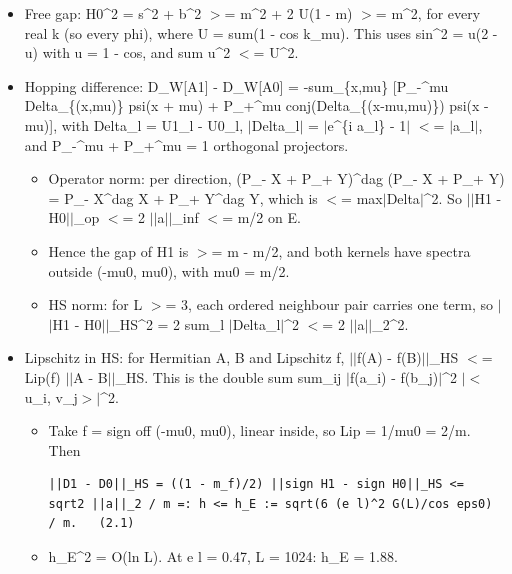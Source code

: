 \documentclass[11pt,a4paper]{article}
\begin{document}
\begin{itemize}
\item{} Free gap: H0\textasciicircum{}2 = s\textasciicircum{}2 + b\textasciicircum{}2 $>$= m\textasciicircum{}2 + 2 U(1 - m) $>$= m\textasciicircum{}2, for every real k (so every phi), where U = sum(1 - cos k\_mu).
This uses sin\textasciicircum{}2 = u(2 - u) with u = 1 - cos, and sum u\textasciicircum{}2 $<$= U\textasciicircum{}2.
\item{} Hopping difference: D\_W[A1] - D\_W[A0] = -sum\_\{x,mu\} [P\_-\textasciicircum{}mu Delta\_\{(x,mu)\} psi(x + mu) + P\_+\textasciicircum{}mu conj(Delta\_\{(x-mu,mu)\}) psi(x - mu)],
with Delta\_l = U1\_l - U0\_l, $|$Delta\_l$|$ = $|$e\textasciicircum{}\{i a\_l\} - 1$|$ $<$= $|$a\_l$|$, and P\_-\textasciicircum{}mu + P\_+\textasciicircum{}mu = 1 orthogonal projectors.
\begin{itemize}
\item{} Operator norm: per direction, (P\_- X + P\_+ Y)\textasciicircum{}dag (P\_- X + P\_+ Y) = P\_- X\textasciicircum{}dag X + P\_+ Y\textasciicircum{}dag Y, which is $<$=
max$|$Delta$|$\textasciicircum{}2. So $|$$|$H1 - H0$|$$|$\_op $<$= 2 $|$$|$a$|$$|$\_inf $<$= m/2 on E.
\item{} Hence the gap of H1 is $>$= m - m/2, and both kernels have spectra outside (-mu0, mu0), with mu0 = m/2.
\item{} HS norm: for L $>$= 3, each ordered neighbour pair carries one term, so $|$$|$H1 - H0$|$$|$\_HS\textasciicircum{}2 = 2 sum\_l $|$Delta\_l$|$\textasciicircum{}2 $<$=
2 $|$$|$a$|$$|$\_2\textasciicircum{}2.
\end{itemize}

\item{} Lipschitz in HS: for Hermitian A, B and Lipschitz f, $|$$|$f(A) - f(B)$|$$|$\_HS $<$= Lip(f) $|$$|$A - B$|$$|$\_HS. This is the
double sum sum\_ij $|$f(a\_i) - f(b\_j)$|$\textasciicircum{}2 $|$$<$u\_i, v\_j$>$$|$\textasciicircum{}2.
\begin{itemize}
\item{} Take f = sign off (-mu0, mu0), linear inside, so Lip = 1/mu0 = 2/m. Then
\begin{Verbatim}[breaklines=true,breakanywhere=true,fontsize=\small]
||D1 - D0||_HS = ((1 - m_f)/2) ||sign H1 - sign H0||_HS <= sqrt2 ||a||_2 / m =: h <= h_E := sqrt(6 (e l)^2 G(L)/cos eps0) / m.   (2.1)
\end{Verbatim}

\item{} h\_E\textasciicircum{}2 = O(ln L). At e l = 0.47, L = 1024: h\_E = 1.88.
\end{itemize}

\end{itemize}
\end{document}

